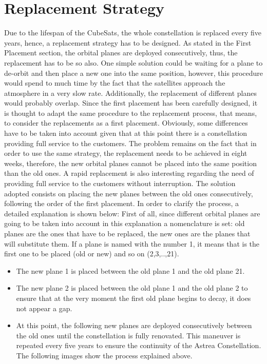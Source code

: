 \section{Replacement Strategy}
Due to the lifespan of the CubeSats, the whole constellation is replaced every five years, hence, a replacement strategy has to be designed. As stated in the First Placement section, the orbital planes are deployed consecutively, thus, the replacement has to be so also. One simple solution could be waiting for a plane to de-orbit and then place a new one into the same position, however, this procedure would spend to much time by the fact that the satellites approach the atmosphere in a very slow rate. Additionally, the replacement of different planes would probably overlap. Since the first placement has been carefully designed, it is thought to adapt the same procedure to the replacement process, that means, to consider the replacements as a first placement. Obviously, some differences have to be taken into account given that at this point there is a constellation providing full service to the customers. The problem remains on the fact that in order to use the same strategy, the replacement needs to be achieved in eight weeks, therefore, the new orbital planes cannot be placed into the same position than the old ones. A rapid replacement is also interesting regarding the need of providing full service to the customers without interruption. The solution adopted consists on placing the new planes between the old ones consecutively, following the order of the first placement. In order to clarify the process, a detailed explanation is shown below:
\newline
First of all, since different orbital planes are going to be taken into account in this explanation a nomenclature is set: old planes are the ones that have to be replaced, the new ones are the planes that will substitute them. If a plane is named with the number 1, it means that is the first one to be placed (old or new) and so on (2,3,..,21). 
\begin{itemize}
\item The new plane 1 is placed between the old plane 1 and the old plane 21.
\item The new plane 2 is placed between the old plane 1 and the old plane 2 to ensure that at the very moment the first old plane begins to decay, it does not appear a gap.
\item At this point, the following new planes are deployed consecutively between the old ones until the constellation is fully renovated. This maneuver is repeated every five years to ensure the continuity of the Astrea Constellation. 
The following images show the process explained above.
\end{itemize}
